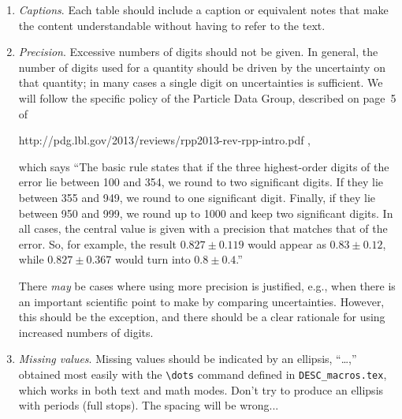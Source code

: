 \documentclass[letterpaper,11pt]{article}
\begin{document}
\begin{enumerate}

\item{\it Captions\/}.  Each table should include a caption or equivalent notes that make the content understandable without having to refer to the text.

\item {\it Precision\/}. Excessive numbers of digits should not be given.  In general, the number
of digits used for a quantity should be driven by the uncertainty on that
quantity; in many cases a
single digit on uncertainties is sufficient.  We will follow the specific
policy of the Particle Data Group, described on page~5 of

{http://pdg.lbl.gov/2013/reviews/rpp2013-rev-rpp-intro.pdf} ,

\noindent which says ``The basic rule states that if the three
highest-order digits of the error lie between 100 and 354, we round to two
significant digits.  If they lie between 355 and 949, we round to one
significant digit.  Finally, if they lie between 950 and 999, we round up to
1000 and keep two significant digits.  In all cases, the central value is given
with a precision that matches that of the error.  So, for example, the result
$0.827\pm0.119$ would appear as $0.83\pm0.12$, while
$0.827\pm0.367$ would turn into $0.8\pm0.4$.''

There {\it may\/} be cases where using more precision is justified, e.g.,
when there is an important scientific point to make by comparing uncertainties.
However, this should be the exception, and there should be a clear rationale
for using increased numbers of digits.

%

\item {\it Missing values\/}. Missing values should be indicated by an ellipsis, ``\dots,'' obtained
most easily with the \verb|\dots| command defined in \verb|DESC_macros.tex|, which works in
both text and math modes.  Don't try to produce an ellipsis with periods (full
stops).  The spacing will be wrong... 


\end{enumerate}
\end{document}
